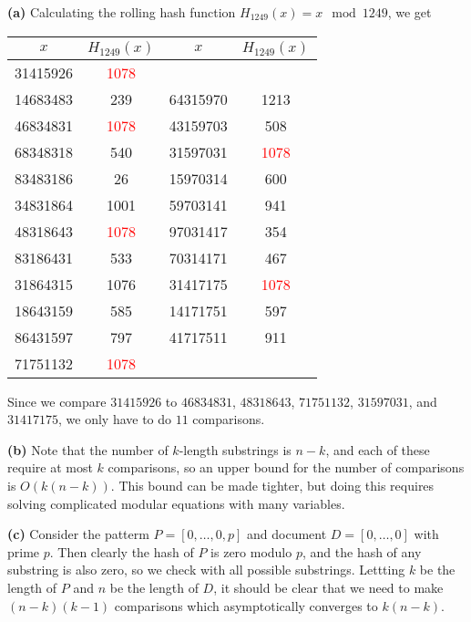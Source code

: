\documentclass[11pt,letterpaper]{article}
\begin{document}
\begin{solution}
    \textbf{(a)} Calculating the rolling hash function $H_{1249}(x)=x\mod 1249$, we get
    \begin{center}
        \begin{tabular}{|c|c|c|c|}
        \hline
        $x$ &$H_{1249}(x)$ & $x$& $H_{1249}(x)$\\
        \hline
        31415926 & \textcolor{red}{1078} & &\\
        \hline
        \hline
        14683483 & 239& 64315970 & 1213\\
        46834831 & \textcolor{red}{1078} &  43159703 & 508\\
        68348318 & 540 & 31597031 & \textcolor{red}{1078}\\
        83483186 & 26 & 15970314 & 600\\
        34831864 & 1001 &  59703141 & 941\\
        48318643 & \textcolor{red}{1078} & 97031417 & 354\\ 
        83186431 & 533 & 70314171 & 467\\
        31864315 & 1076 & 31417175 & \textcolor{red}{1078}\\ 
        18643159 & 585 & 14171751 & 597\\ 
        86431597 & 797 & 41717511 & 911\\
        71751132 & \textcolor{red}{1078} & & \\ 
        \hline
        \end{tabular}
    \end{center} 
    Since we compare $31415926$ to $46834831$, $48318643$, $71751132$, $31597031$, and $31417175$, we only have to do $11$ comparisons.   
    
    \textbf{(b)} Note that the number of $k$-length substrings is $n-k$, and each of these require at most $k$ comparisons, so an upper bound for the number of comparisons is $O(k(n-k))$. This bound can be made tighter, but doing this requires solving complicated modular equations with many variables.
    
    \textbf{(c)} Consider the patterm $P=[0,\ldots,0,p]$ and document $D=[0,\ldots,0]$ with prime $p$. Then clearly the hash of $P$ is zero modulo $p$, and the hash of any substring is also zero, so we check with all possible substrings. Lettting $k$ be the length of $P$ and $n$ be the length of $D$, it should be clear that we need to make $(n-k)(k-1)$ comparisons which asymptotically converges to $k(n-k)$. 
\end{solution}
\end{document}
